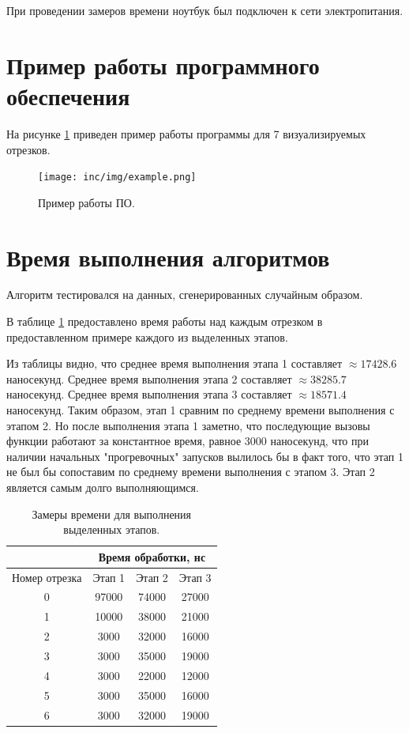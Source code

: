 \documentclass[12pt]{report}
\begin{document}
При проведении замеров времени ноутбук был подключен к сети электропитания.

\section{Пример работы программного обеспечения}
На рисунке \ref{img:example} приведен пример работы программы для 7 визуализируемых отрезков.

\begin{figure}
\begin{center}
\texttt{[image: inc/img/example.png]}
\captionsetup{justification=centering}
	\caption{Пример работы ПО.}
	\label{img:example}	
\end{center}
\end{figure}

\newpage
\section{Время выполнения алгоритмов}
Алгоритм тестировался на данных, сгенерированных случайным образом.

В таблице \ref{time1} предоставлено время работы над каждым отрезком в предоставленном примере каждого из выделенных этапов.

Из таблицы видно, что среднее время выполнения этапа 1 составляет $\approx 17428.6$ наносекунд. Среднее время выполнения этапа 2 составляет $\approx 38285.7$ наносекунд. Среднее время выполнения этапа 3 составляет $\approx 18571.4$ наносекунд. Таким образом, этап 1 сравним по среднему времени выполнения с этапом 2. Но после выполнения этапа 1 заметно, что последующие вызовы функции работают за константное время, равное 3000 наносекунд, что при наличии начальных "прогревочных" запусков вылилось бы в факт того, что этап 1 не был бы сопоставим по среднему времени выполнения с этапом 3. Этап 2 является самым долго выполняющимся.

\begin{table}[h]
	\begin{center}
		\caption{\label{time1} Замеры времени для выполнения выделенных этапов.}
		\begin{tabular}{|c |c |c |c|} 
 			\hline
 			&\multicolumn{3}{|c|}{Время обработки, нс}\\
 			\hline
			Номер отрезка & Этап 1 & Этап 2 & Этап 3\\ [0.5ex] 
 			\hline\hline
 			0 & 97000 & 74000 & 27000 \\
 			\hline
 			1 & 10000 & 38000 & 21000 \\
 			\hline
			2 & 3000 & 32000 & 16000 \\
			\hline
			3 & 3000 & 35000 & 19000 \\
			\hline
			4 & 3000 & 22000 & 12000 \\
			\hline
			5 & 3000 & 35000 & 16000 \\
			\hline
			6 & 3000 & 32000 & 19000 \\
			\hline
			\end{tabular}
	\end{center}
\end{table}
\end{document}
